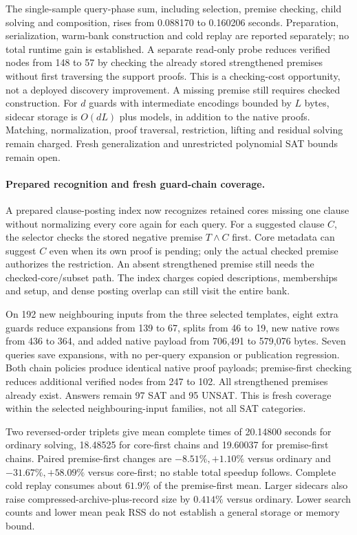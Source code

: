 \documentclass[11pt,a4paper]{article}
\numberwithin{equation}{section}
\theoremstyle{plain}
\theoremstyle{definition}
\theoremstyle{remark}
\begin{document}
The single-sample query-phase sum, including selection, premise checking, child
solving and composition, rises from 0.088170 to 0.160206 seconds. Preparation,
serialization, warm-bank construction and cold replay are reported separately;
no total runtime gain is established. A separate read-only probe reduces verified
nodes from 148 to 57 by checking the already stored strengthened premises without
first traversing the support proofs. This is a checking-cost opportunity, not a
deployed discovery improvement. A missing premise still requires checked
construction. For $d$ guards with intermediate encodings bounded by $L$ bytes,
sidecar storage is $O(dL)$ plus models, in addition to the native proofs. Matching,
normalization, proof traversal, restriction, lifting and residual solving remain
charged. Fresh generalization and unrestricted polynomial SAT bounds remain open.

\paragraph{Prepared recognition and fresh guard-chain coverage.}
A prepared clause-posting index now recognizes retained cores missing one clause
without normalizing every core again for each query. For a suggested clause $C$,
the selector checks the stored negative premise $T\wedge C$ first. Core metadata
can suggest $C$ even when its own proof is pending; only the actual checked
premise authorizes the restriction. An absent strengthened premise still needs
the checked-core/subset path. The index charges copied descriptions, memberships
and setup, and dense posting overlap can still visit the entire bank.

On 192 new neighbouring inputs from the three selected templates, eight extra
guards reduce expansions from 139 to 67, splits from 46 to 19, new native rows
from 436 to 364, and added native payload from 706,491 to 579,076 bytes. Seven
queries save expansions, with no per-query expansion or publication regression.
Both chain policies produce identical native proof payloads; premise-first
checking reduces additional verified nodes from 247 to 102. All strengthened
premises already exist. Answers remain 97 SAT and 95 UNSAT. This is fresh
coverage within the selected neighbouring-input families, not all SAT categories.

Two reversed-order triplets give mean complete times of 20.14800 seconds for
ordinary solving, 18.48525 for core-first chains and 19.60037 for premise-first
chains. Paired premise-first changes are $-8.51\%,+1.10\%$ versus ordinary and
$-31.67\%,+58.09\%$ versus core-first; no stable total speedup follows. Complete
cold replay consumes about $61.9\%$ of the premise-first mean. Larger sidecars
also raise compressed-archive-plus-record size by $0.414\%$ versus ordinary.
Lower search counts and lower mean peak RSS do not establish a general storage
or memory bound.
\end{document}
